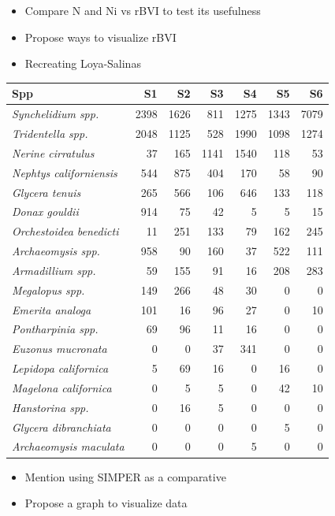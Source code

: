 \documentclass[
]{article}
\providecommand{\tightlist}{%
  \setlength{\itemsep}{0pt}\setlength{\parskip}{0pt}}
\begin{document}
\begin{itemize}
\item
  Compare N and Ni vs rBVI to test its usefulness
\item
  Propose ways to visualize rBVI
\item
  Recreating Loya-Salinas
\end{itemize}

\begin{tabular}{>{}lrrrrrr}
\toprule
Spp & S1 & S2 & S3 & S4 & S5 & S6\\
\midrule
\em{Synchelidium spp.} & 2398 & 1626 & 811 & 1275 & 1343 & 7079\\
\em{Tridentella spp.} & 2048 & 1125 & 528 & 1990 & 1098 & 1274\\
\em{Nerine cirratulus} & 37 & 165 & 1141 & 1540 & 118 & 53\\
\em{Nephtys californiensis} & 544 & 875 & 404 & 170 & 58 & 90\\
\em{Glycera tenuis} & 265 & 566 & 106 & 646 & 133 & 118\\
\addlinespace
\em{Donax gouldii} & 914 & 75 & 42 & 5 & 5 & 15\\
\em{Orchestoidea benedicti} & 11 & 251 & 133 & 79 & 162 & 245\\
\em{Archaeomysis spp.} & 958 & 90 & 160 & 37 & 522 & 111\\
\em{Armadillium spp.} & 59 & 155 & 91 & 16 & 208 & 283\\
\em{Megalopus spp.} & 149 & 266 & 48 & 30 & 0 & 0\\
\addlinespace
\em{Emerita analoga} & 101 & 16 & 96 & 27 & 0 & 10\\
\em{Pontharpinia spp.} & 69 & 96 & 11 & 16 & 0 & 0\\
\em{Euzonus mucronata} & 0 & 0 & 37 & 341 & 0 & 0\\
\em{Lepidopa californica} & 5 & 69 & 16 & 0 & 16 & 0\\
\em{Magelona californica} & 0 & 5 & 5 & 0 & 42 & 10\\
\addlinespace
\em{Hanstorina spp.} & 0 & 16 & 5 & 0 & 0 & 0\\
\em{Glycera dibranchiata} & 0 & 0 & 0 & 0 & 5 & 0\\
\em{Archaeomysis maculata} & 0 & 0 & 0 & 5 & 0 & 0\\
\bottomrule
\end{tabular}

\begin{itemize}
\tightlist
\item
  Mention using SIMPER as a comparative
\item
  Propose a graph to visualize data
\end{itemize}
\end{document}
